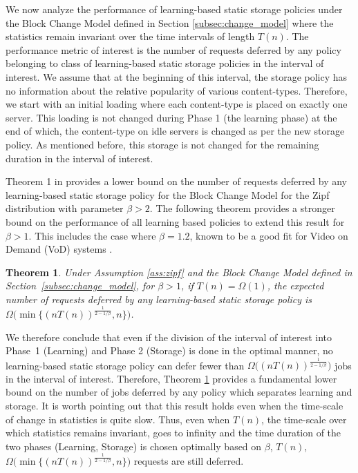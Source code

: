 \documentclass[10pt, conference, letterpaper]{IEEEtran}
\newtheorem{theorem}{Theorem}
\begin{document}
We now analyze the performance of learning-based static storage
policies under the Block Change Model defined in Section
\ref{subsec:change_model} where the statistics remain invariant over
the time intervals of length $T(n)$. The performance metric of
interest is the number of requests deferred by any policy belonging to
class of learning-based static storage policies in the interval of
interest. We assume that at the beginning of this interval, the
storage policy has no information about the relative popularity of
various content-types. Therefore, we start with an initial loading
where each content-type is placed on exactly one server. This loading is
not changed during Phase 1 (the learning phase) at the end of which,
the content-type on idle servers is changed as per the new storage
policy. As mentioned before, this storage is not changed for the
remaining duration in the interval of interest.




Theorem 1 in \cite{SGSS14} provides a lower bound on the number of requests
deferred by any learning-based static storage policy for the Block Change Model for the Zipf distribution with parameter $\beta > 2$. The following theorem provides a stronger bound on the performance of all learning based policies to extend this result for $\beta > 1$. This includes the case where $\beta  = 1.2$, known to be a good fit for Video on Demand (VoD) systems \cite{fricker2012impact}.


\begin{theorem}
	\label{thm:converse}
	Under Assumption \ref{ass:zipf} and the Block Change Model defined in
	Section~\ref{subsec:change_model}, for $\beta > 1$, if $T(n) =
	\Omega(1)$, the expected number
	of requests deferred by any learning-based static storage policy is
	$\Omega\big(\min\{(nT(n))^{\frac{1}{2-1/\beta}},n\}\big)$.
\end{theorem}

We therefore conclude that even if the division of the interval of
interest into Phase~1 (Learning) and Phase 2 (Storage) is done in the
optimal manner, no learning-based static storage policy can defer
fewer than $\Omega\big((nT(n))^{\frac{1}{2-1/\beta}}\big)$ jobs in the interval of
interest. Therefore, Theorem \ref{thm:converse} provides a fundamental
lower bound on the number of jobs deferred by any policy which
separates learning and storage. It is worth pointing out that this
result holds even when the time-scale of change in statistics is quite
slow. Thus, even when $T(n)$, the time-scale over which statistics
remains invariant, goes to infinity and the time duration of the two phases
(Learning, Storage) is chosen optimally based on $\beta$, $T(n)$, $\Omega\big(\min\{(nT(n))^{\frac{1}{2-1/\beta}},n\}\big)$ requests are still deferred.
\end{document}
